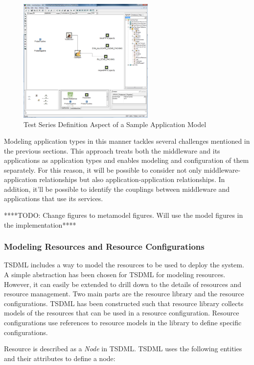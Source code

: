 \begin{figure}
	\centering
		\includegraphics[width=0.60\textwidth]{figures/ApplicationModelTestSeries.png}
	\caption{Test Series Definition Aspect of a Sample Application Model}
	\label{fig:ApplicationModelTestSeries}
\end{figure}

Modeling application types in this manner tackles several challenges mentioned in the previous sections. This approach treats both the middleware and its applications as application types and enables modeling and configuration of them separately. For this reason, it will be possible to consider not only middleware-application relationships but also application-application relationships. In addition, it'll be possible to identify the couplings between middleware and applications that use its services.

****TODO: Change figures to metamodel figures. Will use the model figures in the implementation****

\subsubsection{Modeling Resources and Resource Configurations}
TSDML includes a way to model the resources to be used to deploy the system. A simple abstraction has been chosen for TSDML for modeling resources. However, it can easily be extended to drill down to the details of resources and resource management. Two main parts are the resource library and the resource configurations. TSDML has been constructed such that resource library collects models of the resources that can be used in a resource configuration. Resource configurations use references to resource models in the library to define specific configurations.

Resource is described as a \textit{Node} in TSDML. TSDML uses the following entities and their attributes to define a node:

